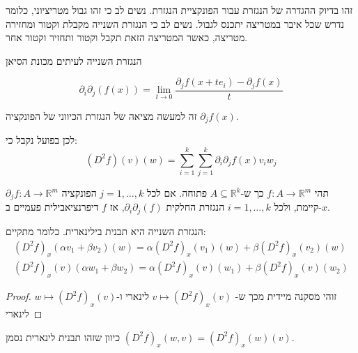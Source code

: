 \documentclass{tstextbook}
\begin{document}
זהו בדיוק ההגדרה של הנגזרת עבור הפונקציית הנגזרת. נשים לב כי זהו גבול מטריציוני, כלומר נדרש שכל איבר במטריצה יתכנס לגבול. נשים לב כי הנגזרת השנייה מקבלת וקטור ומחזירה מטריצה, כאשר המטריצה הזאת תקבל וקטור ותחזיר וקטור אחר.

\begin{remark}
הנגזרת השנייה לעיתים מכונת הסיאן

\end{remark}
\begin{definition}
$$\partial_{i}\partial_{j}\left(f\left(x\right)\right)=\lim_{ t \to 0 } \frac{\partial_{j}f\left(x+t e_{i}\right)-\partial_{j}f\left(x\right)}{t}$$

\end{definition}
זה למעשה מציאה של הנגזרת הכיווני של הפונקציה \(\partial_{j}f(x)\).

לכן בפועל נקבל כי:
$$\left(D^{2}f\right)\left(v\right)\left(w\right)=\sum_{i=1}^{k}\sum_{j=1}^{k}\partial_{i}\partial_{j}f\left(x\right)v_{i}w_{j}$$

\begin{proposition}
תהי \(f:A\to\mathbb{R}^m\) כך ש-\(A\subseteq \mathbb{R}^k\) פתוחה. אם לכל \(j=1,\dots,k\) הפונקציה \(\partial_{j}f:A\to\mathbb{R}^m\) קיימת, ולכל \(i=1,\dots,k\) הנגזרת החלקית \(\partial_{i}\partial _j(f)\), אז \(f\) דיפרנציאבילית פעמיים ב-\(x\).

\end{proposition}
\begin{proposition}
הנגזרת השנייה היא תבנית בילינארית. כלומר מתקיים:
$$\begin{array}{c}{{\left(D^{2}f\right)_{x}\left(\alpha v_{1}+\beta v_{2}\right)\left(w\right)=\alpha\left(D^{2}f\right)_{x}\left(v_{1}\right)\left(w\right)+\beta\left(D^{2}f\right)_{x}\left(v_{2}\right)\left(w\right)}}\\ {{\left(D^{2}f\right)_{x}\left(v\right)\left(\alpha w_{1}+\beta w_{2}\right)=\alpha\left(D^{2}f\right)_{x}\left(v\right)\left(w_{1}\right)+\beta\left(D^{2}f\right)_{x}\left(v\right)\left(w_{2}\right)}}\end{array}$$

\end{proposition}
\begin{proof}
זוהי מסקנה מיידית מכך ש- \(v\mapsto (D^2f)_{x}(v)\) לינארי ו-\(w\mapsto (D^2f)_{x}(v)\) לינארי

\end{proof}
כיוון שזהו תבנית לינארית נסמן \((D^2f)_{x}(w,v)=(D^2f)_{x}(w)(v)\).
\end{document}
